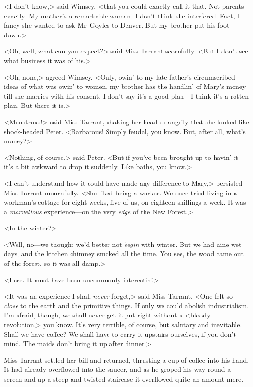 <I don't know,> said Wimsey, <that you could exactly call it that. Not parents exactly. My mother's a remarkable woman. I don't think she interfered. Fact, I fancy she wanted to ask Mr~Goyles to Denver. But my brother put his foot down.>

<Oh, well, what can you expect?> said Miss Tarrant scornfully. <But I don't see what business it was of his.>

<Oh, none,> agreed Wimsey. <Only, owin' to my late father's circumscribed ideas of what was owin' to women, my brother has the handlin' of Mary's money till she marries with his consent. I don't say it's a good plan—I think it's a rotten plan. But there it is.>

<Monstrous!> said Miss Tarrant, shaking her head so angrily that she looked like shock-headed Peter. <Barbarous! Simply feudal, you know.  But, after all, what's money?>

<Nothing, of course,> said Peter. <But if you've been brought up to havin' it it's a bit awkward to drop it suddenly. Like baths, you know.>

<I can't understand how it could have made any difference to Mary,> persisted Miss Tarrant mournfully. <She liked being a worker. We once tried living in a workman's cottage for eight weeks, five of us, on eighteen shillings a week. It was a \emph{marvellous} experience—on the very \emph{edge} of the New Forest.>

<In the winter?>

<Well, no—we thought we'd better not \emph{begin} with winter. But we had nine wet days, and the kitchen chimney smoked all the time. You see, the wood came out of the forest, so it was all damp.>

<I see. It must have been uncommonly interestin'.>

<It was an experience I shall \emph{never} forget,> said Miss Tarrant. <One felt so \emph{close} to the earth and the primitive things. If only we could abolish industrialism. I'm afraid, though, we shall never get it put right without a <bloody revolution,> you know. It's very terrible, of course, but salutary and inevitable. Shall we have coffee? We shall have to carry it upstairs ourselves, if you don't mind. The maids don't bring it up after dinner.>

Miss Tarrant settled her bill and returned, thrusting a cup of coffee into his hand. It had already overflowed into the saucer, and as he groped his way round a screen and up a steep and twisted staircase it overflowed quite an amount more.

